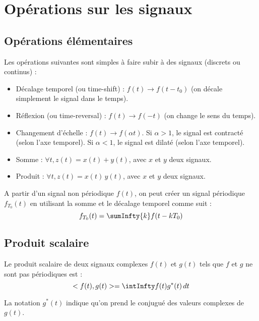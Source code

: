 \section{Opérations sur les signaux}
    \subsection{Opérations élémentaires}
        Les opérations suivantes sont simples à faire subir à des signaux (discrets ou continus) :
        \begin{itemize}
            \item Décalage temporel (ou time-shift) : $f(t) \longrightarrow f(t-t_0)$ (on décale simplement le signal dans le temps).
            \item Réflexion (ou time-reversal) : $f(t) \longrightarrow f(-t)$ (on change le sens du temps).
            \item Changement d'échelle : $f(t) \longrightarrow f(\alpha t)$. Si $\alpha > 1$, le signal est contracté (selon l'axe temporel). Si $\alpha < 1$, le signal est dilaté (selon l'axe temporel).
            \item Somme : $\forall t, z(t) = x(t) + y(t)$, avec $x$ et $y$ deux signaux.
            \item Produit : $\forall t, z(t) = x(t)\,y(t)$, avec $x$ et $y$ deux signaux.
        \end{itemize}

        \begin{remarque}
            A partir d'un signal non périodique $f(t)$, on peut créer un signal périodique $f_{T_0}(t)$ en utilisant la somme et le décalage temporel comme suit :
            $$
                f_{T_0}(t) = \sumInfty{k} f(t - kT_0)
            $$
        \end{remarque}

    \subsection{Produit scalaire}
        Le produit scalaire de deux signaux complexes $f(t)$ et $g(t)$ tels que $f$ et $g$ ne sont pas périodiques est :
        $$
            < f(t), g(t) > = \intInfty f(t)g^*(t)\,dt
        $$
        
        La notation $g^*(t)$ indique qu'on prend le conjugué des valeurs complexes de $g(t)$.


